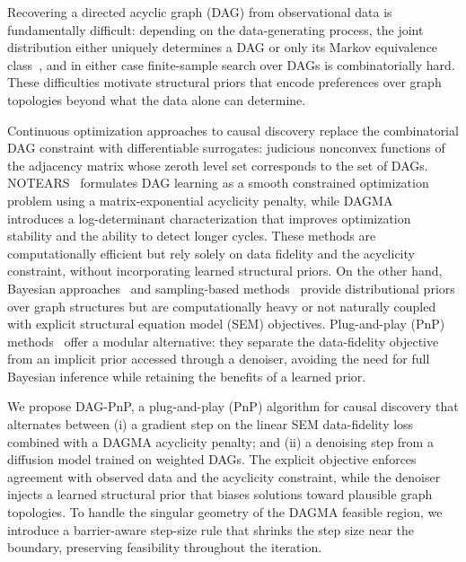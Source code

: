 \documentclass[conference]{IEEEtran}
\begin{document}
	Recovering a directed acyclic graph (DAG) from observational data is fundamentally difficult: depending on the data-generating process, the joint distribution either uniquely determines a DAG or only its Markov equivalence class~\cite{peters2017elements, spirtes2000causation}, and in either case finite-sample search over DAGs is combinatorially hard. These difficulties motivate structural priors that encode preferences over graph topologies beyond what the data alone can determine.
	
	Continuous optimization approaches to causal discovery replace the combinatorial DAG constraint with differentiable surrogates: judicious nonconvex functions of the adjacency matrix whose zeroth level set corresponds to the set of DAGs. NOTEARS~\cite{zheng2018dags} formulates DAG learning as a smooth constrained optimization problem using a matrix-exponential acyclicity penalty, while DAGMA~\cite{bello2022dagma} introduces a log-determinant characterization that improves optimization stability and the ability to detect longer cycles. These methods are computationally efficient but rely solely on data fidelity and the acyclicity constraint, without incorporating learned structural priors. On the other hand, Bayesian approaches~\cite{heckerman1995learning} and sampling-based methods~\cite{deleu2022bayesian, charpentier2022sampling} provide distributional priors over graph structures but are computationally heavy or not naturally coupled with explicit structural equation model (SEM) objectives. 
    Plug-and-play (PnP) methods~\cite{venkatakrishnan2013pnp, graikos2022diffusion} offer a modular alternative: they separate the data-fidelity objective from an implicit prior accessed through a denoiser, avoiding the need for full Bayesian inference while retaining the benefits of a learned prior.
	
	We propose DAG-PnP, a plug-and-play (PnP) algorithm for causal discovery that alternates between (i) a gradient step on the linear SEM data-fidelity loss combined with a DAGMA acyclicity penalty; and (ii) a denoising step from a diffusion model trained on weighted DAGs. The explicit objective enforces agreement with observed data and the acyclicity constraint, while the denoiser injects a learned structural prior that biases solutions toward plausible graph topologies. To handle the singular geometry of the DAGMA feasible region, we introduce a barrier-aware step-size rule that shrinks the step size near the boundary, preserving feasibility throughout the iteration.
	
\end{document}
